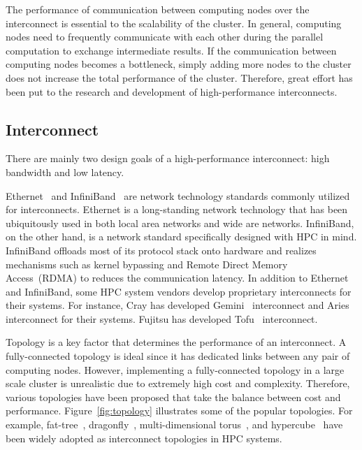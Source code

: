 The performance of communication between computing nodes over the interconnect
is essential to the scalability of the cluster. In general, computing nodes
need to frequently communicate with each other during the parallel computation
to exchange intermediate results. If the communication between computing nodes
becomes a bottleneck, simply adding more nodes to the cluster does not
increase the total performance of the cluster. Therefore, great effort has
been put to the research and development of high-performance interconnects.

\subsection{Interconnect}\label{sec:i-interconnect}

There are mainly two design goals of a high-performance interconnect: high
bandwidth and low latency.

Ethernet~\autocite{Trowbridge2007} and InfiniBand~\autocite{Buyya2009} are
network technology standards commonly utilized for interconnects. Ethernet is
a long-standing network technology that has been ubiquitously used in both
local area networks and wide are networks. InfiniBand, on the other hand, is a
network standard specifically designed with HPC in mind. InfiniBand offloads
most of its protocol stack onto hardware and realizes mechanisms such as
kernel bypassing and Remote Direct Memory Access~(RDMA) to reduces the
communication latency. In addition to Ethernet and InfiniBand, some HPC system
vendors develop proprietary interconnects for their systems. For instance,
Cray has developed Gemini~\autocite{Alverson2010} interconnect and
Aries~\autocite{Faanes2012} interconnect for their systems. Fujitsu has
developed Tofu~\autocite{Ajima2012} interconnect.

Topology is a key factor that determines the performance of an interconnect.
A fully-connected topology is ideal since it has dedicated links between any
pair of computing nodes. However, implementing a fully-connected topology in a
large scale cluster is unrealistic due to extremely high cost and complexity.
Therefore, various topologies have been proposed that take the balance
between cost and performance. Figure~\ref{fig:topology} illustrates some of
the popular topologies. For example, fat-tree~\autocite{Leiserson1985},
dragonfly~\autocite{Kim2008}, multi-dimensional
torus~\autocite{Adiga2005,Ajima2012}, and hypercube~\autocite{Dally2003} have
been widely adopted as interconnect topologies in HPC systems.

